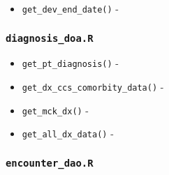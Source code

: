 \documentclass[
]{book}
\providecommand{\tightlist}{%
  \setlength{\itemsep}{0pt}\setlength{\parskip}{0pt}}
\begin{document}
\begin{itemize}
\tightlist
\item
  \texttt{get\_dev\_end\_date()} -
\end{itemize}

\hypertarget{diagnosis_doa.r}{%
\subsubsection{\texorpdfstring{\texttt{diagnosis\_doa.R}}{diagnosis\_doa.R}}\label{diagnosis_doa.r}}

\begin{itemize}
\tightlist
\item
  \texttt{get\_pt\_diagnosis()} -
\item
  \texttt{get\_dx\_ccs\_comorbity\_data()} -
\item
  \texttt{get\_mck\_dx()} -
\item
  \texttt{get\_all\_dx\_data()} -
\end{itemize}

\hypertarget{encounter_dao.r}{%
\subsubsection{\texorpdfstring{\texttt{encounter\_dao.R}}{encounter\_dao.R}}\label{encounter_dao.r}}
\end{document}
